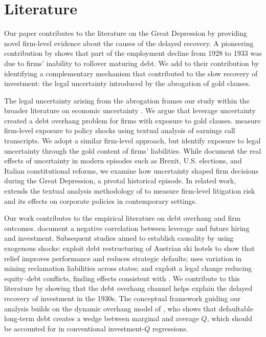 \section{Literature}
\label{sec:literature}

\noindent Our paper contributes to the literature on the Great Depression by providing novel firm-level evidence about the causes of the delayed recovery. A pioneering contribution by \cite{Benmelech2018} shows that part of the employment decline from 1928 to 1933 was due to firms' inability to rollover maturing debt. We add to their contribution by identifying a complementary mechanism that contributed to the slow recovery of investment: the legal uncertainty introduced by the abrogation of gold clauses.

The legal uncertainty arising from the abrogation frames our study within the broader literature on economic uncertainty \citep{Bloom2009, Baker2016, Hassan2019}. We argue that leverage uncertainty created a debt overhang problem for firms with exposure to gold clauses. \cite{Hassan2019} measure firm-level exposure to policy shocks using textual analysis of earnings call transcripts. We adopt a similar firm-level approach, but identify exposure to legal uncertainty through the gold content of firms' liabilities. While \cite{Hassan2019} document the real effects of uncertainty in modern episodes such as Brexit, U.S. elections, and Italian constitutional reforms, we examine how uncertainty shaped firm decisions during the Great Depression, a pivotal historical episode. In related work, \cite{Bennett2025} extends the textual analysis methodology of \cite{Hassan2019} to measure firm-level litigation risk and its effects on corporate policies in contemporary settings.

Our work contributes to the empirical literature on debt overhang \citep{Myers1977} and firm outcomes. \cite{Lang1996} document a negative correlation between leverage and future hiring and investment. Subsequent studies aimed to establish causality by using exogenous shocks: \cite{Giroud2012} exploit debt restructuring of Austrian ski hotels to show that relief improves performance and reduces strategic defaults; \cite{Wittry2018} uses variation in mining reclamation liabilities across states; and \cite{Becker2012} exploit a legal change reducing equity–debt conflicts, finding effects consistent with \cite{Myers1977}. We contribute to this literature by showing that the debt overhang channel helps explain the delayed recovery of investment in the 1930s. The conceptual framework guiding our analysis builds on the dynamic overhang model of \cite{Hennessy2004}, who shows that defaultable long-term debt creates a wedge between marginal and average $Q$, which should be accounted for in conventional investment-$Q$ regressions.

